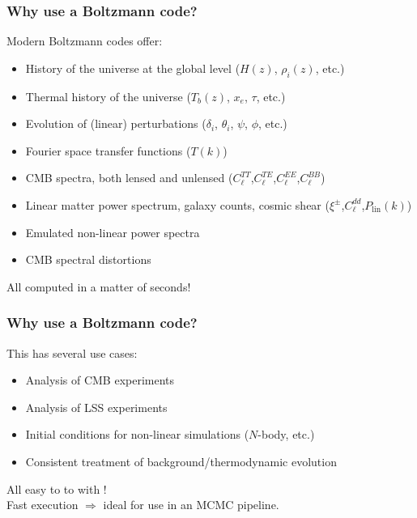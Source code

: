 \begin{frame}[fragile]
	\frametitle{Why use a Boltzmann code?}
	Modern Boltzmann codes offer:
	\vspace{0.5\baselineskip}
	\begin{itemize}
		\item History of the universe at the global level ($H(z)$, $\rho_i(z)$, etc.)
		\item Thermal history of the universe ($T_b(z)$, $x_e$, $\tau$, etc.)
		\item Evolution of (linear) perturbations ($\delta_i$, $\theta_i$, $\psi$, $\phi$, etc.)
		\item Fourier space transfer functions ($T(k)$)
		\item CMB spectra, both lensed and unlensed ($C_\ell^{TT}$,$C_\ell^{TE}$,$C_\ell^{EE}$,$C_\ell^{BB}$)
		\item Linear matter power spectrum, galaxy counts, cosmic shear ($\xi^\pm$,$C_\ell^{dd}$,$P_\mathrm{lin}(k)$)
		\item Emulated non-linear power spectra
		\item CMB spectral distortions
	\end{itemize}
	All computed in a matter of seconds!

\end{frame}

\begin{frame}[fragile]
	\frametitle{Why use a Boltzmann code?}
	This has several use cases:
	\vspace{0.5\baselineskip}
	\begin{itemize}
		\item Analysis of CMB experiments
		\item Analysis of LSS experiments
		\item Initial conditions for non-linear simulations ($N$-body, etc.)
		\item Consistent treatment of background/thermodynamic evolution
	\end{itemize}
	All easy to to with {\Red \CLASS{}}!\\
		\vspace{\baselineskip}
	Fast execution $\Rightarrow$ ideal for use in an MCMC pipeline.

\end{frame}

